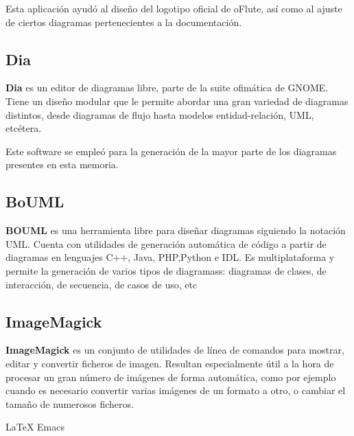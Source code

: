 Esta aplicación ayudó al diseño del logotipo oficial de oFlute, así como al
ajuste de ciertos diagramas pertenecientes a la documentación.

\subsection{Dia}
\textbf{Dia} es un editor de diagramas libre, parte de la suite ofimática de
GNOME. Tiene un diseño modular que le permite abordar una gran variedad de
diagramas distintos, desde diagramas de flujo hasta modelos entidad-relación,
UML, etcétera.

Este software se empleó para la generación de la mayor parte de los diagramas
presentes en esta memoria.

\subsection{BoUML}

\textbf{BOUML} es una herramienta libre para diseñar diagramas siguiendo la
notación UML. Cuenta con utilidades de generación automática de código a partir
de diagramas en lenguajes C++, Java, PHP,Python e IDL. Es multiplataforma y
permite la generación de varios tipos de diagramass: diagramas de clases, de
interacción, de secuencia, de casos de uso, etc

\subsection{ImageMagick}

\textbf{ImageMagick} es un conjunto de utilidades de línea de comandos para
mostrar, editar y convertir ficheros de imagen. Resultan especialmente útil a la
hora de procesar un gran número de imágenes de forma automática, como por
ejemplo cuando es necesario convertir varias imágenes de un formato a otro, o
cambiar el tamaño de numerosos ficheros.


LaTeX
Emacs
